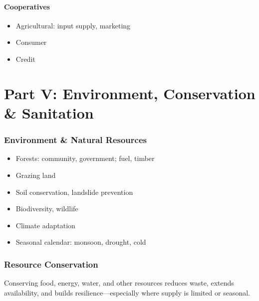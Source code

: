 \documentclass[11pt,a4paper]{article}
\begin{document}
\subsection{Cooperatives}
\begin{itemize}
    \item Agricultural: input supply, marketing
    \item Consumer
    \item Credit
\end{itemize}

\part{Part V: Environment, Conservation \& Sanitation}

\section{Environment \& Natural Resources}
\begin{itemize}
    \item Forests: community, government; fuel, timber
    \item Grazing land
    \item Soil conservation, landslide prevention
    \item Biodiversity, wildlife
    \item Climate adaptation
    \item Seasonal calendar: monsoon, drought, cold
\end{itemize}

\section{Resource Conservation}
Conserving food, energy, water, and other resources reduces waste, extends availability, and builds resilience---especially where supply is limited or seasonal.
\end{document}
